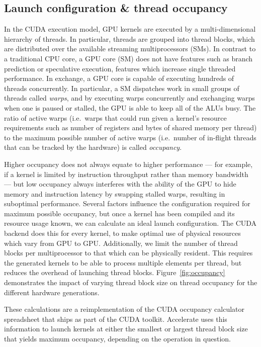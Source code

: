 \subsection{Launch configuration \& thread occupancy}
\label{sec:launch_configuration}
\label{sec:thread_occupancy}

In the CUDA execution model, GPU kernels are executed by a multi-dimensional
hierarchy of threads. In particular, threads are grouped into thread blocks, which
are distributed over the available streaming multiprocessors (SMs). In contrast
to a traditional CPU core, a GPU core (SM) does not have features such as branch
prediction or speculative execution, features which increase single threaded
performance. In exchange, a GPU core is capable of executing hundreds of threads
concurrently. In particular, a SM dispatches work in small groups of threads
called \emph{warps}\cuda[warp]{}, and by executing warps concurrently and
exchanging warps when one is paused or stalled, the GPU is able to keep all of
the ALUs busy. The ratio of active warps (i.e.\ warps that could run given a
kernel's resource requirements such as number of registers and bytes of shared
memory per thread) to the maximum possible number of active warps (i.e.\ number
of in-flight threads that can be tracked by the hardware) is called
\emph{occupancy}.

Higher occupancy does not always equate to higher performance --- for example,
if a kernel is limited by instruction throughput rather than memory bandwidth
--- but low occupancy always interferes with the ability of the GPU to hide
memory and instruction latency by swapping stalled warps, resulting in
suboptimal performance. Several factors influence the configuration required for
maximum possible occupancy, but once a kernel has been compiled and its resource
usage known,
we can calculate an ideal launch configuration. The CUDA backend does this for
every kernel, to make optimal use of physical resources which vary from GPU to
GPU\@. Additionally, we limit the number of thread blocks per multiprocessor to
that which can be physically resident. This requires the generated kernels to be
able to process multiple elements per thread, but reduces the overhead of
launching thread blocks. Figure~\ref{fig:occupancy} demonstrates the impact of
varying thread block size on thread occupancy for the different hardware
generations.

These calculations are a reimplementation of the CUDA occupancy calculator
spreadsheet that ships as part of the CUDA toolkit. Accelerate uses this
information to launch kernels at either the smallest or largest thread block
size that yields maximum occupancy, depending on the operation in question.

